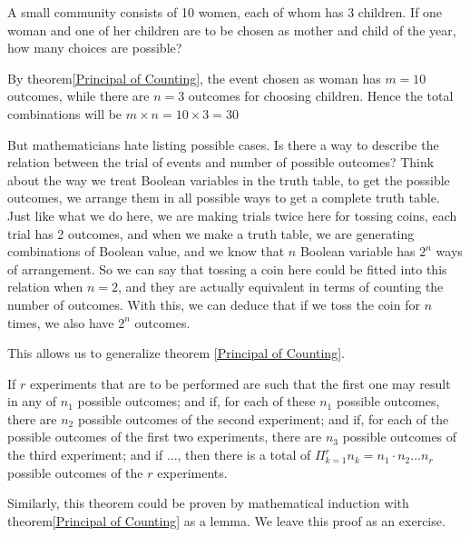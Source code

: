     \begin{example}
        A small community consists of 10 women, each of whom has 3 children. If one woman and one of her children are to be chosen as mother and child of the year,
        how many choices are possible?
    \end{example}
        \begin{solution}
            By theorem\ref{Principal of Counting}, the event chosen as woman has $m=10$ outcomes, while there are $n = 3$ outcomes for choosing children. 
            Hence the total combinations will be $m\times n = 10\times 3 =30 $
        \end{solution}
    But mathematicians hate listing possible cases. Is there a way to describe the relation between the trial of events and number
    of possible outcomes? Think about the way we treat Boolean variables in the truth table, to get the possible outcomes, we arrange them in all possible ways to get a complete
    truth table. Just like what we do here, we are making trials twice here for tossing coins, each trial has 2 outcomes, and when we make a truth table, we are generating combinations of
    Boolean value, and we know that $n$ Boolean variable has $2^n$ ways of arrangement. So we can say that tossing a coin here could be fitted into this relation when $n=2$, and they are
    actually equivalent in terms of  counting the number of outcomes. With this, we can deduce that if we toss the coin for $n$ times, we also have $2^n$ outcomes.

    This allows us to generalize theorem \ref{Principal of Counting}.

    \begin{theorem}\label{Generalized Principal of Counting}
        If $r$ experiments that are to be performed are such that the first one may result in any of $n_1$ possible outcomes; and if, for each of these $n_1$  possible outcomes,
        there are $n_2$  possible outcomes of the second experiment; and if, for each of the possible outcomes of the first two experiments, there are $n_3$  possible outcomes
        of the third experiment; and if ..., then there is a total of  $\Pi_{k=1}^r{n_k} = n_1 \cdot n_2 \dots n_r$ possible outcomes of the $r$ experiments.
    \end{theorem}

    Similarly, this theorem could be proven by mathematical induction with theorem\ref{Principal of Counting} as a lemma. We leave this proof as an exercise.

